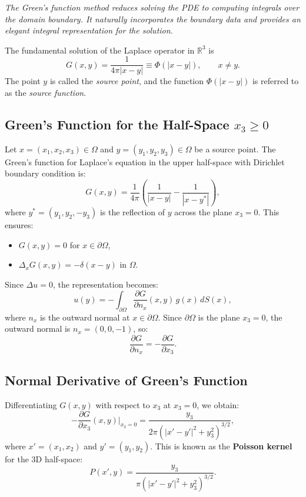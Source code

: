 \documentclass[12pt,oneside,reqno]{amsart}%
\theoremstyle{plain}
\numberwithin{equation}{section}
\begin{document}
{\it The Green's function method reduces solving the PDE to computing integrals over the domain boundary. It naturally incorporates the boundary data and provides an elegant integral representation for the solution.}

The fundamental solution of the Laplace operator in $\mathbb{R}^3$ is
\begin{equation}\label{Phi}
G(x,y)=\frac{1}{4\pi |x-y|} \equiv \Phi(|x-y|), \qquad x\neq y .
\end{equation}
The point $y$ is called the \emph{source point}, and the function $\Phi(|x-y|)$ is referred to as the \emph{source function}.

\subsection{Green's Function for the Half-Space $x_3\ge 0$}\label{HalfSpace}\hfill

Let $x = (x_1, x_2, x_3) \in \Omega$ and $y = (y_1, y_2, y_3) \in \Omega$ be a source point. The Green's function for Laplace's equation in the upper half-space with Dirichlet boundary condition is:
\[
G(x, y) = \frac{1}{4\pi} \left( \frac{1}{|x - y|} - \frac{1}{|x - y^*|} \right),
\]
where $y^* = (y_1, y_2, -y_3)$ is the reflection of $y$ across the plane $x_3 = 0$. This ensures:
\begin{itemize}
    \item $G(x, y) = 0$ for $x \in \partial \Omega$,
    \item $\Delta_x G(x, y) = -\delta(x - y)$ in $\Omega$.
\end{itemize}

Since $\Delta u = 0$, the representation becomes:
\[
u(y) = -\int_{\partial \Omega} \frac{\partial G}{\partial n_x}(x, y)\, g(x)\, dS(x),
\]
where $n_x$ is the outward normal at $x \in \partial \Omega$. Since $\partial \Omega$ is the plane $x_3 = 0$, the outward normal is $n_x = (0, 0, -1)$, so:
\[
\frac{\partial G}{\partial n_x} = -\frac{\partial G}{\partial x_3}.
\]

\subsection*{Normal Derivative of Green's Function}

Differentiating $G(x, y)$ with respect to $x_3$ at $x_3 = 0$, we obtain:
\begin{equation}\label{dGdn}
-\frac{\partial G}{\partial x_3}(x, y)\Big|_{x_3=0} = \frac{y_3}{2\pi \left( |x' - y'|^2 + y_3^2 \right)^{3/2}},
\end{equation}
where $x' = (x_1, x_2)$ and $y' = (y_1, y_2)$. This is known as the \textbf{Poisson kernel} for the 3D half-space:
\[
P(x', y) = \frac{y_3}{\pi \left( |x' - y'|^2 + y_3^2 \right)^{3/2}}.
\]
\end{document}

